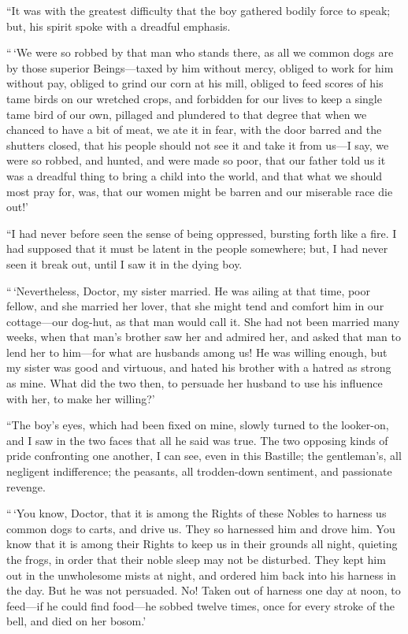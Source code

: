 ``It was with the greatest difficulty that the boy gathered bodily
force to speak; but, his spirit spoke with a dreadful emphasis.

``\,`We were so robbed by that man who stands there, as all we common
dogs are by those superior Beings---taxed by him without mercy, obliged
to work for him without pay, obliged to grind our corn at his mill,
obliged to feed scores of his tame birds on our wretched crops, and
forbidden for our lives to keep a single tame bird of our own,
pillaged and plundered to that degree that when we chanced to have a
bit of meat, we ate it in fear, with the door barred and the shutters
closed, that his people should not see it and take it from us---I say,
we were so robbed, and hunted, and were made so poor, that our father
told us it was a dreadful thing to bring a child into the world, and
that what we should most pray for, was, that our women might be barren
and our miserable race die out!'

``I had never before seen the sense of being oppressed, bursting forth
like a fire.  I had supposed that it must be latent in the people
somewhere; but, I had never seen it break out, until I saw it in the
dying boy.

``\,`Nevertheless, Doctor, my sister married.  He was ailing at that
time, poor fellow, and she married her lover, that she might tend and
comfort him in our cottage---our dog-hut, as that man would call it.
She had not been married many weeks, when that man's brother saw her
and admired her, and asked that man to lend her to him---for what are
husbands among us!  He was willing enough, but my sister was good and
virtuous, and hated his brother with a hatred as strong as mine.
What did the two then, to persuade her husband to use his influence
with her, to make her willing?'

``The boy's eyes, which had been fixed on mine, slowly turned to the
looker-on, and I saw in the two faces that all he said was true.
The two opposing kinds of pride confronting one another, I can see,
even in this Bastille; the gentleman's, all negligent indifference;
the peasants, all trodden-down sentiment, and passionate revenge.

``\,`You know, Doctor, that it is among the Rights of these Nobles to
harness us common dogs to carts, and drive us.  They so harnessed him
and drove him.  You know that it is among their Rights to keep us in
their grounds all night, quieting the frogs, in order that their
noble sleep may not be disturbed.  They kept him out in the unwholesome
mists at night, and ordered him back into his harness in the day.
But he was not persuaded.  No!  Taken out of harness one day at noon,
to feed---if he could find food---he sobbed twelve times, once for
every stroke of the bell, and died on her bosom.'

